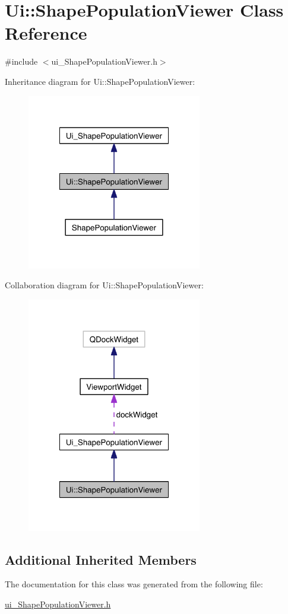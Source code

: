 \hypertarget{class_ui_1_1_shape_population_viewer}{\section{Ui\-:\-:Shape\-Population\-Viewer Class Reference}
\label{class_ui_1_1_shape_population_viewer}
}


{\ttfamily \#include $<$ui\-\_\-\-Shape\-Population\-Viewer.\-h$>$}



Inheritance diagram for Ui\-:\-:Shape\-Population\-Viewer\-:\nopagebreak
\begin{figure}[H]
\begin{center}
\leavevmode
\includegraphics[width=216pt]{class_ui_1_1_shape_population_viewer__inherit__graph}
\end{center}
\end{figure}


Collaboration diagram for Ui\-:\-:Shape\-Population\-Viewer\-:\nopagebreak
\begin{figure}[H]
\begin{center}
\leavevmode
\includegraphics[width=216pt]{class_ui_1_1_shape_population_viewer__coll__graph}
\end{center}
\end{figure}
\subsection*{Additional Inherited Members}


The documentation for this class was generated from the following file\-:\begin{DoxyCompactItemize}
\item 
\hyperlink{ui___shape_population_viewer_8h}{ui\-\_\-\-Shape\-Population\-Viewer.\-h}\end{DoxyCompactItemize}
